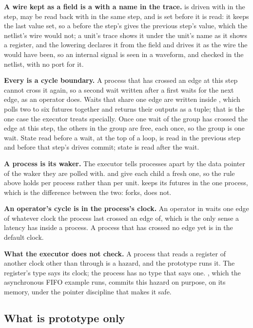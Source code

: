 \textbf{A wire kept as a field is a  with a name in the
trace.}  is driven with  in the step, may be
read back with  in the same step, and is set before it is
read: it keeps the last value set, so a  before the step's
 gives the previous step's value, which the netlist's wire
would not; a unit's trace shows it under the unit's name as it shows a
register, and the lowering declares it from the field and drives it
as the wire the  would have been, so an internal signal is
seen in a waveform, and checked in the netlist, with no port for it.

\textbf{Every  is a cycle boundary.} A process that has
crossed an edge at this step cannot cross it again, so a second wait
written after a first waits for the next edge, as an operator does.
Waits that share one edge are written inside , which
polls two to six futures together and returns their outputs as a tuple;
that
is the one case the executor treats specially. Once one wait of the
group has crossed the edge at this step, the others in the group are
free, each once, so the group is one wait. State read before a wait,
at the top of a loop, is read in the previous step and before that
step's drives commit; state is read after the wait.

\textbf{A process is its waker.} The executor tells processes apart by
the data pointer of the waker they are polled with.  and
 give each child a fresh one, so the rule above holds
per process rather than per unit.  keeps its futures in
the one process, which is the difference between the two: 
forks,  does not.

\textbf{An operator's cycle is in the process's clock.} An operator in
 waits one edge of whatever clock the process
last crossed an edge of, which is the only sense a latency has inside
a process. A process that has crossed no edge yet is in the default
clock.

\textbf{What the executor does not check.} A process that reads a
register of another clock other than through  is a
hazard, and the prototype runs it. The register's type says its clock;
the process has no type that says one. , which the
asynchronous FIFO example runs, commits this hazard on purpose, on its
memory, under the pointer discipline that makes it safe.

\subsection{What is prototype only}

